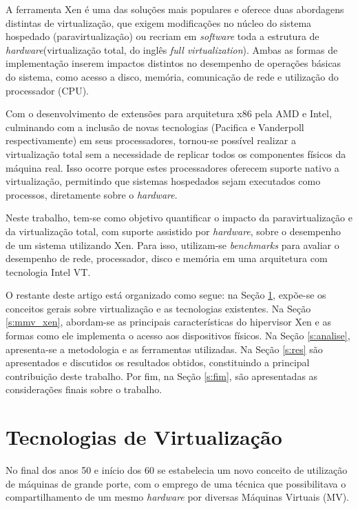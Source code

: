 \documentclass[times, 10pt,twocolumn]{article}
\def\sw{\textit{software}\xspace}
\def\hw{\textit{hardware}\xspace}
\def\hpv{hipervisor\xspace}
\begin{document}
A ferramenta Xen é uma das soluções mais populares e oferece duas abordagens distintas
de virtualização, que exigem modificações no núcleo do sistema hospedado 
(paravirtualização) ou recriam em \sw toda a estrutura de \hw (virtualização 
total, do inglês \textit{full virtualization}). Ambas as formas de implementação inserem
impactos distintos no desempenho de operações básicas do sistema, como acesso a disco, 
memória, comunicação de rede e  utilização do processador (CPU).

Com o desenvolvimento de extensões para arquitetura x86 pela AMD e Intel, 
culminando com a inclusão de novas tecnologias (Pacifica e Vanderpoll respectivamente) 
em seus processadores, tornou-se possível realizar a virtualização total sem a 
necessidade de replicar todos os componentes físicos da máquina real. Isso ocorre 
porque estes processadores oferecem suporte nativo a virtualização, permitindo 
que sistemas hospedados sejam executados como processos, diretamente sobre o \hw. 

Neste trabalho, tem-se como objetivo quantificar o impacto da paravirtualização 
e da virtualização total, com suporte assistido por \hw, sobre o desempenho de um 
sistema utilizando Xen. Para isso, utilizam-se \textit{benchmarks} para avaliar o
desempenho de rede,  processador, disco e memória em uma arquitetura com 
tecnologia Intel VT. 

O restante deste artigo está organizado como segue: na Seção \ref{s:virtualizacao},
expõe-se os conceitos gerais sobre virtualização e as tecnologias existentes. Na 
Seção \ref{s:mmv_xen}, abordam-se as principais características do \hpv Xen e as 
formas como ele implementa o acesso aos dispositivos físicos. Na Seção \ref{s:analise},
apresenta-se a metodologia e as ferramentas utilizadas. Na Seção \ref{s:res} são 
apresentados e discutidos os resultados obtidos, constituindo a principal contribuição 
deste trabalho. Por fim, na Seção \ref{s:fim}, são apresentadas as considerações finais sobre o trabalho.


\section{Tecnologias de Virtualização}\label{s:virtualizacao}
No final dos anos 50 e início dos 60 se estabelecia um novo conceito de utilização de
máquinas de grande porte, com o emprego de uma técnica que possibilitava o 
compartilhamento de um mesmo \hw por diversas Máquinas Virtuais (MV).
\end{document}
